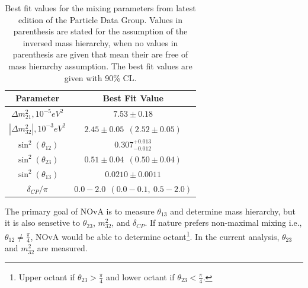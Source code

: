 \begin{table}
\begin{center}
  \renewcommand{\arraystretch}{1.4}
  \begin{tabular}{| c | c |}
    \hline
    \textbf{Parameter}                & \textbf{Best Fit Value} \\ \hline \hline
    $\Delta  m_{21}^2,  10^{-5} eV^2$ & $7.53\pm 0.18$  \\ \hline
    $|\Delta m_{32}^2|, 10^{-3} eV^2$ & $2.45\pm 0.05~~(2.52\pm 0.05)$ \\ \hline
    $\sin^2(\theta_{12})$             & $0.307^{+0.013}_{-0.012}$ \\ \hline
    $\sin^2(\theta_{23})$             & $0.51\pm 0.04~~ (0.50\pm 0.04)$ \\ \hline
    $\sin^2(\theta_{13})$             & $0.0210\pm 0.0011$ \\ \hline
    $\delta_{CP}/\pi$                 & $0.0-2.0~~(0.0-0.1,~ 0.5-2.0)$  \\
    \hline
  \end{tabular}
\caption{Best fit values for the mixing parameters from latest edition of the Particle Data Group\cite{rpf}. 
Values in parenthesis are stated for the assumption of the inversed mass hierarchy, when no values in parenthesis 
are given that mean their are free of mass hierarchy assumption. The best fit values are given with 90\% CL.} 
\end{center}
\end{table}

The primary goal of NOvA is to measure $\theta_{13}$ and determine mass hierarchy, but it is also sensetive to $\theta_{23}$,
$m_{32}^2$, and $\delta_{CP}$. If nature prefers non-maximal mixing i.e., $\theta_{12} 
\neq \frac{\pi}{4}$, NOvA would be able to determine octant\footnote{Upper octant if $\theta_{23} > \frac{\pi}{4}$
and lower octant if $\theta_{23} < \frac{\pi}{4}$.}. In the current analysis, $\theta_{23}$ and 
$m_{32}^2$ are measured. 

